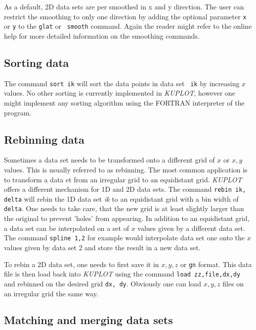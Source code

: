 As a default, 2D data sets are per smoothed in x and y direction.
The user can restrict the smoothing to only one direction by adding
the optional parameter {\tt x} or {\tt y} to the {\tt glat} or {\tt
smooth} command. Again the reader might refer to the online help for
more detailed information on the smoothing commands.


\subsection{Sorting data \label{mat-sort}}

The command {\tt sort ik} will sort the data points in data set {\tt
ik} by increasing $x$ values. No other sorting is currently
implemented in {\it KUPLOT}, however one might implement any sorting
algorithm using the FORTRAN interpreter of the program.


\subsection{Rebinning data \label{mat-rebin}}

Sometimes a data set needs to be transformed onto a different grid
of $x$ or $x,y$ values. This is usually referred to as rebinning.
The most common application is to transform a data et from an
irregular grid to an equidistant grid. {\it KUPLOT} offers a
different mechanism for 1D and 2D data sets. The command {\tt rebin
ik, delta} will rebin the 1D data set {\it ik} to an equidistant
grid with a bin width of {\tt delta}. One needs to take care, that
the new grid is at least slightly larger than the original to
prevent 'holes' from appearing. In addition to an equidistant grid,
a data set can be interpolated on a set of $x$ values given by a
different data set. The command {\tt spline 1,2} for example would
interpolate data set one onto the $x$ values given by data set 2 and
store the result in a new data set.\par

To rebin a 2D data set, one needs to first save it in $x,y,z$ or
{\tt gn} format. This data file is then load back into {\it KUPLOT}
using the command {\tt load zz,file,dx,dy} and rebinned on the
desired grid {\tt dx, dy}. Obviously one can load $x,y,z$ files on
an irregular grid the same way. \par


\subsection{Matching and merging data sets \label{mat-merge}}

